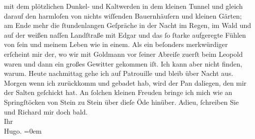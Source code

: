 \begin{ledgroupsized}[t]{13cm}
                    mit dem plötzlichen Dunkel- und Kaltwerden in dem kleinen Tunnel und gleich
                    darauf den harmloſen von nichts wiſſenden Bauernhäuſern und kleinen Gärten; am
                    Ende mehr die ſtundenlangen Geſpräche in der Nacht im Regen, im Wald und auf der
                    weißen naſſen Landſtraße mit Edgar und das ſo
                    ſtarke aufgeregte Fühlen von ſein und meinem Leben wie in einem.\pend
           \pstart
           Als ein beſonders merkwürdiger \label{K_L00464_1v}\label{K_L00464_1h} erſcheint mir der, wo wir mit Goldmann vor ſeiner Abreiſe zuerſt beim Leopold waren und dann ein großes Gewitter
                    gekommen iſt. Ich kann aber nicht finden, warum.\pend
           \pstart
           {\pb}Heute nachmittag gehe ich
                    auf Patrouille und bleib über Nacht aus. Morgen wenn ich zurückkomm und gebadet
                    hab, wird der Pan daliegen, den mir der Salten geſchickt hat. An ſolchen kleinen
                    Freuden bringe ich mich wie an Springſtöcken von Stein zu Stein über dieſe Öde
                    hinüber.\pend
           \pstart
           Adieu, ſchreiben Sie und Richard mir
                    doch bald.{\\[\baselineskip]} Ihr{\\[\baselineskip]}\spacefill\mbox{Hugo.}\pend
           \leftskip=0em{}\endnumbering{}\end{ledgroupsized}  \newcommand{\dateiname}{L00464}\newcommand{\titel}{Hugo von Hofmannsthal an Arthur Schnitzler, 17. [7. 1895]}\newcommand{\editorInnen}{Martin Anton Müller und Gerd-Hermann Susen}
      